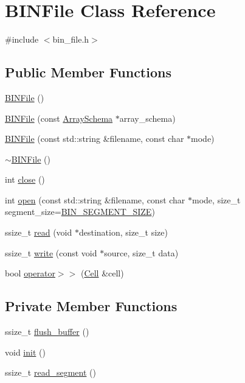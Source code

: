 \hypertarget{classBINFile}{}\section{B\+I\+N\+File Class Reference}
\label{classBINFile}


{\ttfamily \#include $<$bin\+\_\+file.\+h$>$}

\subsection*{Public Member Functions}
\begin{DoxyCompactItemize}
\item 
\hyperlink{classBINFile_a05a9debbcd9940f7a40fcd0224b39368}{B\+I\+N\+File} ()
\item 
\hyperlink{classBINFile_a69adec565de283f8fd940853ce62a892}{B\+I\+N\+File} (const \hyperlink{classArraySchema}{Array\+Schema} $\ast$array\+\_\+schema)
\item 
\hyperlink{classBINFile_a32801630b528cbf6690e8cd84290773a}{B\+I\+N\+File} (const std\+::string \&filename, const char $\ast$mode)
\item 
\hyperlink{classBINFile_a226bf7456de4243515747c93af4bf4d0}{$\sim$\+B\+I\+N\+File} ()
\item 
int \hyperlink{classBINFile_a28ba175b559e4111e19a41e84db12fd8}{close} ()
\item 
int \hyperlink{classBINFile_a60a5384b15aa37bfec6a90769e0d6d0e}{open} (const std\+::string \&filename, const char $\ast$mode, size\+\_\+t segment\+\_\+size=\hyperlink{bin__file_8h_a71c4f1e0f1c967d50e8379182af08ef6}{B\+I\+N\+\_\+\+S\+E\+G\+M\+E\+N\+T\+\_\+\+S\+I\+Z\+E})
\item 
ssize\+\_\+t \hyperlink{classBINFile_a538f9f21efe941296fef850a704f57a2}{read} (void $\ast$destination, size\+\_\+t size)
\item 
ssize\+\_\+t \hyperlink{classBINFile_a20b68d2df1585e45accf7f3a408ce893}{write} (const void $\ast$source, size\+\_\+t data)
\item 
bool \hyperlink{classBINFile_abf7962c22bc33ca0ed05f0aa983a8a9a}{operator$>$$>$} (\hyperlink{classCell}{Cell} \&cell)
\end{DoxyCompactItemize}
\subsection*{Private Member Functions}
\begin{DoxyCompactItemize}
\item 
ssize\+\_\+t \hyperlink{classBINFile_aec87de7200dcfff1ef5ceb9270a9695d}{flush\+\_\+buffer} ()
\item 
void \hyperlink{classBINFile_a3164b6df49cae6c1cd8c3717d769587c}{init} ()
\item 
ssize\+\_\+t \hyperlink{classBINFile_abe10e65058419b0af7854ef5427ff21d}{read\+\_\+segment} ()
\end{DoxyCompactItemize}
